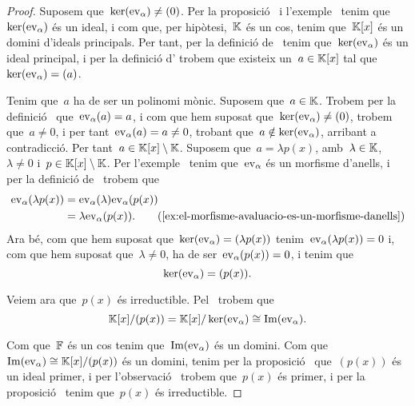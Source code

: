 \documentclass[../../main.tex]{subfiles}
\begin{document}
    \begin{proof} %
        Suposem que~\(\operatorname{ker}(\mathrm{ev}_{\alpha})\neq(0)\).
        Per la proposició~ i l'exemple~ tenim que~\(\operatorname{ker}(\mathrm{ev}_{\alpha})\) és un ideal, i com que, per hipòtesi,~\(\mathbb{K}\) és un cos, tenim que~\(\mathbb{K}[x]\) és un domini d'ideals principals.
        Per tant, per la definició de~ tenim que~\(\operatorname{ker}(\mathrm{ev}_{\alpha})\) és un ideal principal, i per la definició d' trobem que existeix un~\(a\in\mathbb{K}[x]\) tal que~\(\operatorname{ker}(\mathrm{ev}_{\alpha})=(a)\).

        Tenim que~\(a\) ha de ser un polinomi mònic.
        Suposem que~\(a\in\mathbb{K}\).
        Trobem per la definició~ que~\(\mathrm{ev}_{\alpha}(a)=a\), i com que hem suposat que~\(\operatorname{ker}(\mathrm{ev}_{\alpha})\neq(0)\), trobem que~\(a\neq0\), i per tant~\(\mathrm{ev}_{\alpha}(a)=a\neq0\), trobant que~\(a\notin\operatorname{ker}(\mathrm{ev}_{\alpha})\), arribant a contradicció.
        Per tant~\(a\in\mathbb{K}[x]\setminus\mathbb{K}\).
        Suposem que~\(a=\lambda p(x)\), amb~\(\lambda\in\mathbb{K}\),~\(\lambda\neq0\) i~\(p\in\mathbb{K}[x]\setminus\mathbb{K}\).
        Per l'exemple~ tenim que~\(\mathrm{ev}_{\alpha}\) és un morfisme d'anells, i per la definició de~ trobem que
        \begin{align*}
            \ev_{\alpha}(\lambda p(x))&=\ev_{\alpha}(\lambda)\ev_{\alpha}(p(x))\\
            &=\lambda\ev_{\alpha}(p(x)).
            \tag{\ref{ex:el-morfisme-avaluacio-es-un-morfisme-danells}}
        \end{align*}
        Ara bé, com que hem suposat que~\(\operatorname{ker}(\mathrm{ev}_{\alpha})=(\lambda p(x))\) tenim~\(\mathrm{ev}_{\alpha}(\lambda p(x))=0\) i, com que hem suposat que~\(\lambda\neq0\), ha de ser~\(\mathrm{ev}_{\alpha}(p(x))=0\), i tenim que
        \[
            \operatorname{ker}(\mathrm{ev}_{\alpha})=(p(x)).
        \]

        Veiem ara que~\(p(x)\) és irreductible.
        Pel~ trobem que
        \[
            \mathbb{K}[x]/(p(x))=\mathbb{K}[x]/\operatorname{ker}(\mathrm{ev}_{\alpha})\cong\operatorname{Im}(\mathrm{ev}_{\alpha}).
        \]

        Com que~\(\mathbb{F}\) és un cos tenim que~\(\operatorname{Im}(\mathrm{ev}_{\alpha})\) és un domini.
        Com que~\(\operatorname{Im}(\mathrm{ev}_{\alpha})\cong\mathbb{K}[x]/(p(x))\) és un domini, tenim per la proposició~ que~\((p(x))\) és un ideal primer, i per l'observació~ trobem que~\(p(x)\) és primer, i per la proposició~ tenim que~\(p(x)\) és irreductible.
    \end{proof}
\end{document}
